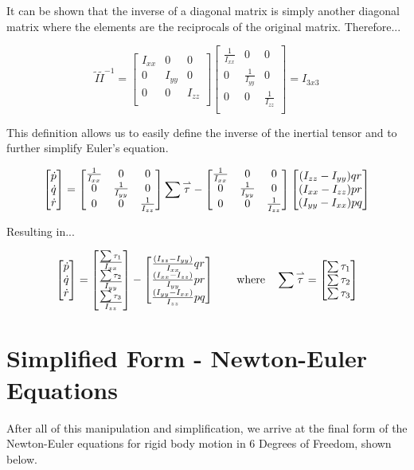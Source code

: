 It can be shown that the inverse of a diagonal matrix is simply another diagonal matrix where the elements are the reciprocals of the original matrix. Therefore...


$$\tilde{I} \tilde{I}^{-1} = \begin{bmatrix}
    I_{xx} & 0 & 0 \\
    0 & I_{yy} & 0 \\
    0 & 0 & I_{zz} \\
\end{bmatrix} \begin{bmatrix}
    \frac{1}{I_{xx}} & 0 & 0 \\
    0 & \frac{1}{I_{yy}} & 0 \\
    0 & 0 & \frac{1}{I_{zz}} \\
\end{bmatrix}  = I_{3x3}$$

This definition allows us to easily define the inverse of the inertial tensor and to further simplify Euler's equation. 


$$ \begin{bmatrix} \dot{p} \\ \dot{q} \\ \dot{r} \end{bmatrix} = \begin{bmatrix}
    \frac{1}{I_{xx}} & 0 & 0 \\
    0 & \frac{1}{I_{yy}} & 0 \\
    0 & 0 & \frac{1}{I_{zz}} \\
\end{bmatrix}\sum\overset{\rightharpoonup}{\tau} - \begin{bmatrix}
    \frac{1}{I_{xx}} & 0 & 0 \\
    0 & \frac{1}{I_{yy}} & 0 \\
    0 & 0 & \frac{1}{I_{zz}} \\
\end{bmatrix}\begin{bmatrix} (I_{zz} - I_{yy})qr \\ (I_{xx} - I_{zz})pr \\ (I_{yy}- I_{xx})pq \end{bmatrix}$$

Resulting in... 


$$ \begin{bmatrix} \dot{p} \\ \dot{q} \\ \dot{r} \end{bmatrix} = \begin{bmatrix} \frac{\sum\tau_{1}}{I_{xx}} \\ \frac{\sum\tau_{2}}{I_{yy}} \\ \frac{\sum\tau_{3}}{I_{zz}} \end{bmatrix} - \begin{bmatrix} \frac{(I_{zz} - I_{yy})}{I_{xx}}qr \\ \frac{(I_{xx} - I_{zz})}{I_{yy}}pr \\ \frac{(I_{yy}- I_{xx})}{I_{zz}}pq \end{bmatrix} \quad \quad \text{where} \quad \sum\overset{\rightharpoonup}{\tau} = \begin{bmatrix} \sum\tau_{1} \\ \sum\tau_{2} \\ \sum\tau_{3} \end{bmatrix}$$

\section{Simplified Form - Newton-Euler Equations}

After all of this manipulation and simplification, we arrive at the final form of the Newton-Euler equations for rigid body motion in 6 Degrees of Freedom, shown below. 



